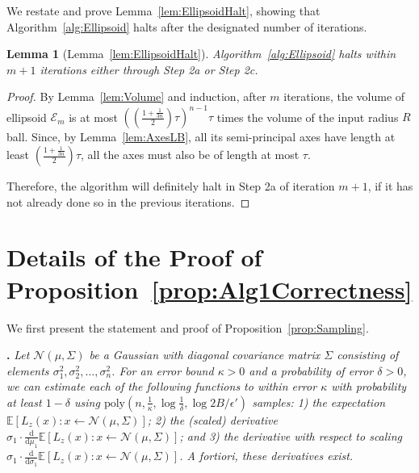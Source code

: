 \documentclass[11pt,letter]{article}
\newcommand{\Exp}{\mathbb{E}}
\renewcommand{\poly}{\mathrm{poly}}
\newcommand{\Normal}{\mathcal{N}}
\renewcommand{\d}{\mathrm{d}}
\newcommand{\Diff}[2][]{\frac{\d#1}{\d#2}}
\numberwithin{nTheorems}{section}
\newtheorem*{lemma*}{Lemma}
\begin{document}
We restate and prove Lemma~\ref{lem:EllipsoidHalt}, showing that Algorithm~\ref{alg:Ellipsoid} halts after the designated number of iterations.
\begin{lemma*}[Lemma~\ref{lem:EllipsoidHalt}]
Algorithm~\ref{alg:Ellipsoid} halts within $m+1$ iterations either through Step 2a or Step 2c.
\end{lemma*}

\begin{proof}
By Lemma~\ref{lem:Volume} and induction, after $m$ iterations, the volume of ellipsoid $\mathcal{E}_m$ is at most $\left(\left(\frac{1+\frac{1}{3n}}{2}\right)\tau\right)^{n-1}\tau$ times the volume of the input radius $R$ ball.
Since, by Lemma~\ref{lem:AxesLB}, all its semi-principal axes have length at least $\left(\frac{1+\frac{1}{3n}}{2}\right)\tau$, all the axes must also be of length at most $\tau$.

Therefore, the algorithm will definitely halt in Step 2a of iteration $m+1$, if it has not already done so in the previous iterations.
\end{proof}

\iffalse
\section{Details of the Proof of Proposition~\ref{prop:Alg1Correctness}}
\label{sec:SingleCutProof}

We first present the statement and proof of Proposition~\ref{prop:Sampling}.

\medskip{}
{\bf .} \emph{Let $\Normal(\mu,\Sigma)$ be a Gaussian with diagonal covariance matrix $\Sigma$ consisting of elements $\sigma_1^2,\sigma_2^2,\ldots,\sigma_n^2$.
  For an error bound $\kappa>0$ and a probability of error $\delta>0$, we can estimate each of the following functions to within error $\kappa$ with probability at least $1-\delta$ using $\poly(n,\frac{1}{\kappa},\log\frac{1}{\delta},\log 2B/\epsilon')$ samples: 1) the expectation $\Exp[L_z(x):x\leftarrow \mathcal{N}(\mu,\Sigma)]$; 2) the (scaled) derivative $\sigma_1\cdot\Diff{\mu_1} \Exp[L_z(x):x\leftarrow \mathcal{N}(\mu,\Sigma)]$; and 3) the derivative with respect to scaling $\sigma_1\cdot\Diff{\sigma_1} \Exp[L_z(x):x\leftarrow \mathcal{N}(\mu,\Sigma)]$. \emph{A fortiori}, these derivatives exist.}
\end{document}
